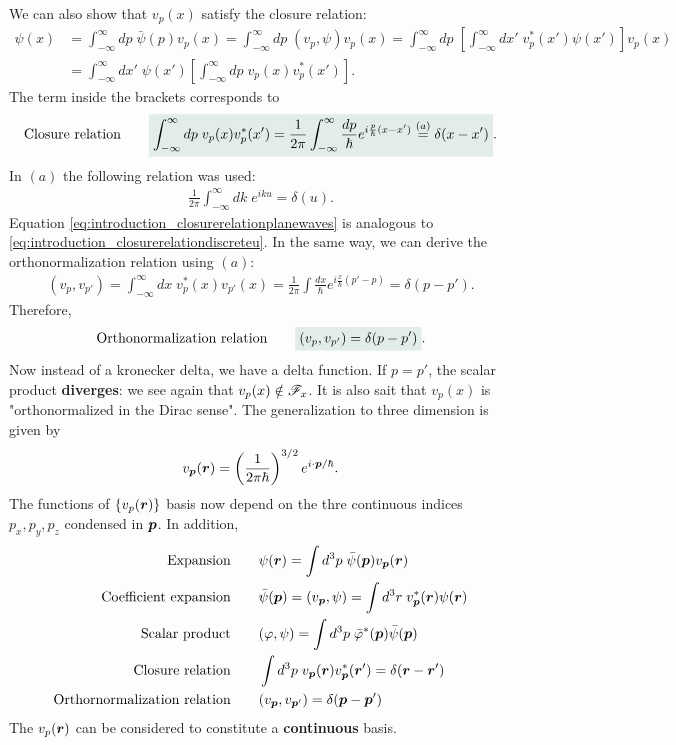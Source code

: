 We can also show that $v_p(x)$ satisfy the closure relation:
{\small
\begin{align*}
    \psi(x)&=\int_{-\infty}^\infty dp\;\bar{\psi}(p)v_p(x)=\int_{-\infty}^\infty dp\;(v_p,\psi)v_p(x)=\int_{-\infty}^\infty dp\;\left[\int_{-\infty}^\infty dx'\;v_p^*(x')\psi(x')\right]v_p(x)\\
    &=\int_{-\infty}^\infty dx'\;\psi(x')\left[\int_{-\infty}^\infty dp\;v_p(x)v^*_p(x')\right].
\end{align*}}
The term inside the brackets corresponds to 
\begin{align}
    \text{Closure relation}\qquad\highlight{\int_{-\infty}^\infty dp\;v_p(x)v^*_p(x')=\frac{1}{2\pi}\int_{-\infty}^\infty\frac{dp}{\hbar}e^{i\frac{p}{\hbar}(x-x')}\stackrel{(a)}{=}\delta(x-x')}.
    \label{eq:introduction_closurerelationplanewaves}
\end{align}
In $(a)$ the following relation was used:
\begin{align*}
    \frac{1}{2\pi}\int_{-\infty}^\infty dk\;e^{iku}=\delta(u).
\end{align*}
Equation \eqref{eq:introduction_closurerelationplanewaves} is analogous to \eqref{eq:introduction_closurerelationdiscreteu}. In the same way, we can derive the orthonormalization relation using $(a)$:
\begin{align*}
    (v_p,v_{p'})=\int_{-\infty}^\infty dx\;v_p^*(x)v_{p'}(x)=\frac{1}{2\pi}\int\frac{dx}{\hbar}e^{i\frac{x}{\hbar}(p'-p)}=\delta(p-p').
\end{align*}
Therefore,
\begin{align}
    \text{Orthonormalization relation}\qquad \highlight{(v_p,v_{p'})=\delta(p-p')}.
    \label{eq:introduction_orthonormalizationrelationplanewaves}
\end{align}
Now instead of a kronecker delta, we have a delta function. If $p=p'$, the scalar product \textbf{diverges}: we see again that $v_p(x)\notin\mathscr{F}_x$. It is also sait that 
$v_p(x)$ is "orthonormalized in the Dirac sense". The generalization to three dimension is given by
\begin{align}
    v_{\bm{p}}(\bm{r})=\left(\frac{1}{2\pi\hbar}\right)^{3/2}e^{i\cdot\bm{p}/\hbar}.
\end{align}
The functions of $\{v_p(\bm{r})\}$ basis now depend on the thre continuous indices $p_x,p_y,p_z$ condensed in $\bm{p}$. In addition,
\begin{align}
    \text{Expansion}&\qquad\psi(\bm{r})=\int d^3p\;\bar{\psi}(\bm{p})v_{\bm{p}}(\bm{r})\\
    \text{Coefficient expansion}&\qquad\bar{\psi}(\bm{p})=(v_{\bm{p}},\psi)=\int d^3r\;v^*_{\bm{p}}(\bm{r})\psi(\bm{r})\\
    \text{Scalar product}&\qquad(\varphi,\psi)=\int d^3p\;\bar{\varphi}^*(\bm{p})\bar{\psi}(\bm{p})\\
    \text{Closure relation}&\qquad\int d^3p\;v_{\bm{p}}(\bm{r})v^*_{\bm{p}}(\bm{r}')=\delta(\bm{r}-\bm{r}')\\
    \text{Orthornormalization relation}&\qquad(v_{\bm{p}},v_{\bm{p}'})=\delta(\bm{p}-\bm{p}')
\end{align}
The $v_p(\bm{r})$ can be considered to constitute a \textbf{continuous} basis.
